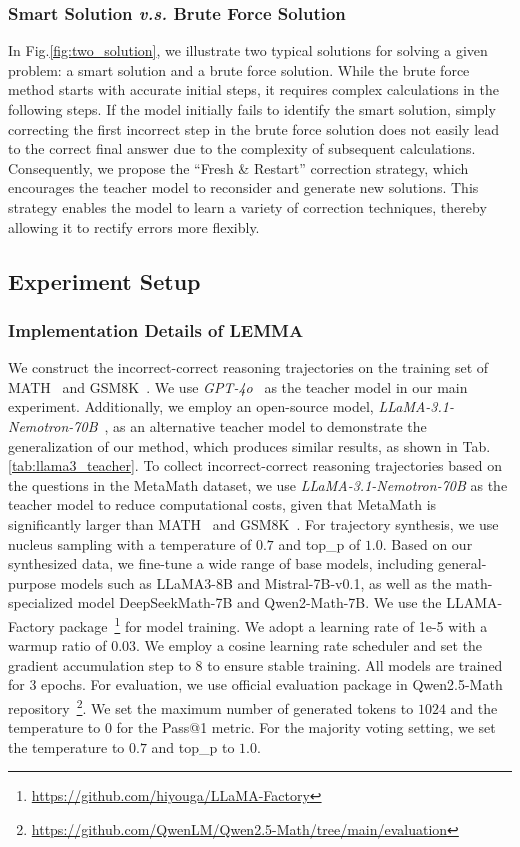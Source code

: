 \subsubsection{Smart Solution \textit{v.s.} Brute Force Solution}


In Fig.\ref{fig:two_solution}, we illustrate two typical solutions for solving a given problem: a smart solution and a brute force solution. While the brute force method starts with accurate initial steps, it requires complex calculations in the following steps. If the model initially fails to identify the smart solution, simply correcting the first incorrect step in the brute force solution does not easily lead to the correct final answer due to the complexity of subsequent calculations. Consequently, we propose the ``Fresh \& Restart'' correction strategy, which encourages the teacher model to reconsider and generate new solutions. This strategy enables the model to learn a variety of correction techniques, thereby allowing it to rectify errors more flexibly.

\subsection{Experiment Setup}
\subsubsection{Implementation Details of LEMMA}
\label{sec:lemma_details}
We construct the incorrect-correct reasoning trajectories on the training set of MATH~\cite{hendrycksmath2021} and GSM8K~\cite{cobbe2021training}. We use \textit{GPT-4o}~\cite{hurst2024gpt} as the teacher model in our main experiment. Additionally, we employ an open-source model, \textit{LLaMA-3.1-Nemotron-70B}~\cite{wang2024helpsteer2}, as an alternative teacher model to demonstrate the generalization of our method, which produces similar results, as shown in Tab.\ref{tab:llama3_teacher}. To collect incorrect-correct reasoning trajectories based on the questions in the MetaMath dataset, we use \textit{LLaMA-3.1-Nemotron-70B} as the teacher model to reduce computational costs, given that MetaMath is significantly larger than MATH~\cite{hendrycksmath2021} and GSM8K~\cite{cobbe2021training}. 
For trajectory synthesis, we use nucleus sampling with a temperature of $0.7$ and top\_p of $1.0$. Based on our synthesized data, we fine-tune a wide range of base models, including general-purpose models such as LLaMA3-8B and Mistral-7B-v0.1, as well as the math-specialized model DeepSeekMath-7B and Qwen2-Math-7B.
We use the LLAMA-Factory package~\footnote{\url{https://github.com/hiyouga/LLaMA-Factory}} for model training. We adopt a learning rate of 1e-5 with a warmup ratio of $0.03$.  We employ a cosine learning rate scheduler and set the gradient accumulation step to 8 to ensure stable training. 
All models are trained for 3 epochs. For evaluation, we use official evaluation package in Qwen2.5-Math repository~\footnote{\url{https://github.com/QwenLM/Qwen2.5-Math/tree/main/evaluation}}. We set the maximum number of generated tokens to $1024$ and the temperature to 0 for the Pass@1 metric. For the majority voting setting, we set the temperature to $0.7$ and top\_p to $1.0$. 

